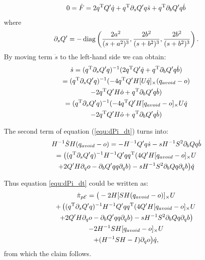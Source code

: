 \documentclass[journal]{IEEEtran}  %
\begin{document}
    \begin{equation}
      0=\dot F =  2q^\mathrm{T} Q' \dot q + q^\mathrm{T} \partial_s Q' q \dot s + q^\mathrm{T} \partial_bQ' q \dot b
    \end{equation}
    where
    \begin{equation}
      \partial_s Q'= -\operatorname{diag}\left(\frac{2a^2}{(s+a^2)^3},\frac{2b^2}{(s+b^2)^3},\frac{2b^2}{(s+b^2)^3}\right).
    \end{equation}
    By moving term $\dot s$ to the left-hand side we can obtain:
    \begin{multline}\label{equ:s_dot}
      \dot s =  (q^\mathrm{T} \partial_s Q' q)^{-1} (2q^\mathrm{T} Q' \dot q + q^\mathrm{T} \partial_b Q' q \dot b)\\
      =  (q^\mathrm{T} \partial_s Q' q)^{-1} (-4q^\mathrm{T} Q' H[U\dot q]_\times (q_{avoid} - o) \\
      -2q^\mathrm{T} Q'H\dot o + q^\mathrm{T} \partial_b Q' q \dot b)\\
      =  (q^\mathrm{T} \partial_s Q' q)^{-1} (-4q^\mathrm{T} Q' H[q_{avoid} - o]_\times U\dot q \\
      -2q^\mathrm{T} Q'H\dot o + q^\mathrm{T} \partial_b Q' q \dot b)
    \end{multline}

    The second term of equation (\ref{equ:dPi_dt}) turns into:
    \begin{multline}
      H^{-1}\dot S H (q_{avoid} - o)
      = - H^{-1} Q' q \dot s - s H^{-1} S^2 \partial_b Q q \dot b\\
      =   \big( (q^\mathrm{T} \partial_s Q' q)^{-1} H^{-1} Q' q q^\mathrm{T}  (4Q' H[q_{avoid} - o]_\times U  \\
      + 2Q' H\partial_q o - \partial_b Q' q q \partial_q b) -  s H^{-1} S^2 \partial_b Q q \partial_q b\big) \dot q\\
    \end{multline}

    Thus equation \eqref{equ:dPi_dt} could be written as:
    \begin{multline}
      \dot \pi_{p\mathcal{E}} = \big(-2 H [ SH(q_{avoid}-o)]_{\times}U   \\
      + \left( (q^\mathrm{T} \partial_s Q' q)^{-1} H^{-1} Q' q q^\mathrm{T}  (4Q' H[q_{avoid} - o]_\times U \right. \\
      \left.+ 2Q' H\partial_q o - \partial_b Q' q q \partial_q b) -  s H^{-1} S^2 \partial_b Q q \partial_q b\right) \\
      -2H^{-1} S H[q_{avoid}-o]_{\times} U  \\
      + (H^{-1}SH -I)\partial_q o \big) \dot q,
    \end{multline}
    from which the claim follows.
  
\end{document}
